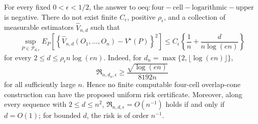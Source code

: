 For every fixed \(0<\epsilon<1/2\), the answer to \(\mathrm{oeq:four-cell-logarithmic-upper}\) is negative.  There do not exist finite \(C_\epsilon\), positive \(\rho_\epsilon\), and a collection of measurable estimators \(\widehat V_{n,d}\) such that
\[
 \sup_{P\in\mathcal P_{d,\epsilon}}
 E_P\!\left[
  \left\{\widehat V_{n,d}(O_1,\ldots,O_n)-V^\star(P)\right\}^2
 \right]
 \le C_\epsilon\left\{\frac1n+\frac d{n\log(en)}\right\}
\]
for every \(2\le d\le\rho_\epsilon n\log(en)\).  Indeed, for \(d_n=\max\{2,\lfloor\log(en)\rfloor\}\),
\[
 \mathfrak R_{n,d_n,\epsilon}
 \ge \frac{\sqrt{\log(en)}}{8192n}
\]
for all sufficiently large \(n\).  Hence no finite computable four-cell overlap-cone construction can have the proposed uniform risk certificate.  Moreover, along every sequence with \(2\le d\le n^2\), \(\mathfrak R_{n,d,\epsilon}=O(n^{-1})\) holds if and only if \(d=O(1)\); for bounded \(d\), the risk is of order \(n^{-1}\).